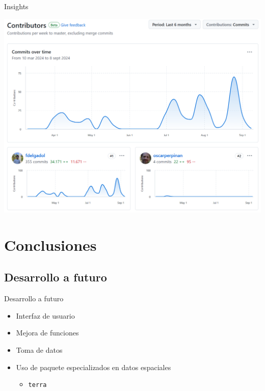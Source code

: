 \documentclass[aspectratio=169, usenames,svgnames,dvipsnames]{beamer}
\begin{document}
\begin{frame}[label={sec:org8a777cd}]{Insights}
\begin{center}
\includegraphics[height=0.9\textheight]{../figuras/contributors.png}
\end{center}
\end{frame}
\section{Conclusiones}
\label{sec:org956430e}
\subsection{Desarrollo a futuro}
\label{sec:org629bc50}
\begin{frame}[label={sec:org73f9b5d},fragile]{Desarrollo a futuro}
 \begin{itemize}
\item Interfaz de usuario

\item Mejora de funciones

\item Toma de datos

\item Uso de paquete especializados en datos espaciales
\begin{itemize}
\item \texttt{terra}
\end{itemize}
\end{itemize}
\end{frame}
\end{document}

